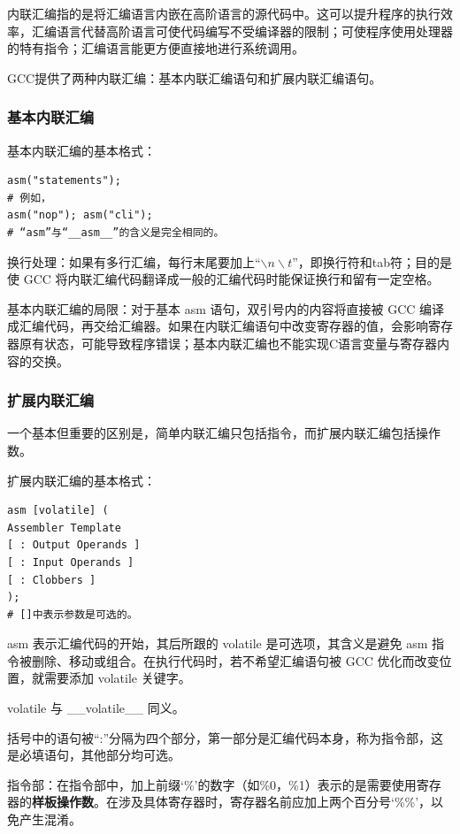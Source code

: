 内联汇编指的是将汇编语言内嵌在高阶语言的源代码中。这可以提升程序的执行效率，汇编语言代替高阶语言可使代码编写不受编译器的限制；可使程序使用处理器的特有指令；汇编语言能更方便直接地进行系统调用。

GCC提供了两种内联汇编：基本内联汇编语句和扩展内联汇编语句。

\subsubsection{基本内联汇编}

基本内联汇编的基本格式：

\begin{lstlisting}
asm("statements");
# 例如，
asm("nop"); asm("cli");
# “asm”与“__asm__”的含义是完全相同的。
\end{lstlisting}

换行处理：如果有多行汇编，每行末尾要加上“$\backslash n \backslash t$”，即换行符和tab符；目的是使 GCC 将内联汇编代码翻译成一般的汇编代码时能保证换行和留有一定空格。

基本内联汇编的局限：对于基本 asm 语句，双引号内的内容将直接被 GCC 编译成汇编代码，再交给汇编器。如果在内联汇编语句中改变寄存器的值，会影响寄存器原有状态，可能导致程序错误；基本内联汇编也不能实现C语言变量与寄存器内容的交换。

\subsubsection{扩展内联汇编}

一个基本但重要的区别是，简单内联汇编只包括指令，而扩展内联汇编包括操作数。

扩展内联汇编的基本格式：

\begin{lstlisting}
asm [volatile] ( 
Assembler Template
[ : Output Operands ]
[ : Input Operands ]
[ : Clobbers ]
);
# []中表示参数是可选的。
\end{lstlisting}

asm 表示汇编代码的开始，其后所跟的 volatile 是可选项，其含义是避免 asm 指令被删除、移动或组合。在执行代码时，若不希望汇编语句被 GCC 优化而改变位置，就需要添加 volatile 关键字。

volatile 与 \_\_volatile\_\_ 同义。

括号中的语句被“:”分隔为四个部分，第一部分是汇编代码本身，称为指令部，这是必填语句，其他部分均可选。

指令部：在指令部中，加上前缀‘\%’的数字（如\%0，\%1）表示的是需要使用寄存器的\textbf{样板操作数}。在涉及具体寄存器时，寄存器名前应加上两个百分号‘\%\%’，以免产生混淆。

